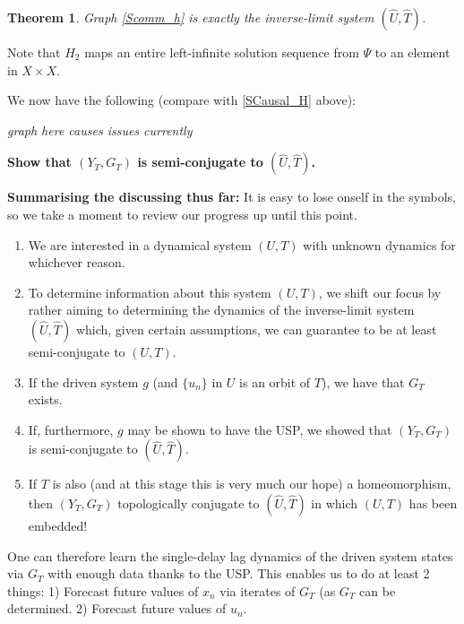 \documentclass[12 pt]{article}
\newtheorem{Theorem}{Theorem}[]
\begin{document}
\begin{Theorem}
  Graph \ref{Scomm_h} is exactly the inverse-limit system $(\hat{U}, \hat{T})$.    
\end{Theorem}


Note that $H_2$ maps an entire left-infinite solution sequence from $\Psi$ to an element in $X\times{X}$.
 
We now have the following (compare with \ref{SCausal_H} above):

\emph{graph here causes issues currently}
 
\textbf{Show that $(Y_T, G_T)$ is semi-conjugate to $(\widehat{U}, \widehat{T})$. }

\textbf{Summarising the discussing thus far:}
It is easy to lose onself in the symbols, so we take a moment to review our progress up until this point.

\vspace{-8mm}
\begin{enumerate}
\item We are interested in a dynamical system $(U,T)$ with unknown dynamics for whichever reason.
\item To determine information about this system $(U,T)$, we shift our focus by rather aiming to determining the dynamics of the inverse-limit system $(\widehat{U}, \widehat{T})$ which, given certain assumptions, we can guarantee to be at least semi-conjugate to $(U,T)$.
\item If the driven system $g$ (and $\{u_n\}$ in $U$  is an orbit of $T$), we have that $G_T$ exists. 
\item If, furthermore, $g$ may be shown to have the USP, we showed that $(Y_T, G_T)$ is semi-conjugate to $(\widehat{U}, \widehat{T})$.
\item If $T$ is also (and at this stage this is very much our hope) a homeomorphism, then $(Y_T, G_T)$ topologically conjugate to $(\widehat{U}, \widehat{T})$ in which $(U,T)$ has been embedded! 
\end{enumerate} 
One can therefore learn the single-delay lag dynamics of the driven system states via $G_T$ with enough data thanks to the USP. This enables us to do at least 2 things: 1) Forecast future values of $x_n$ via iterates of $G_T$ (as $G_T$ can be determined. 2) Forecast future values of $u_n$. 
\end{document}
